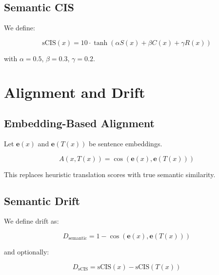 \documentclass{article}
\theoremstyle{definition}
\begin{document}
\subsection{Semantic CIS}
We define:

\begin{equation}
\text{sCIS}(x) = 10 \cdot \tanh\left( \alpha S(x) + \beta C(x) + \gamma R(x) \right)
\end{equation}

with $\alpha=0.5$, $\beta=0.3$, $\gamma=0.2$.

\section{Alignment and Drift}

\subsection{Embedding-Based Alignment}
Let $\mathbf{e}(x)$ and $\mathbf{e}(T(x))$ be sentence embeddings.

\begin{equation}
A(x, T(x)) = \cos(\mathbf{e}(x), \mathbf{e}(T(x)))
\end{equation}

This replaces heuristic translation scores with true semantic similarity.

\subsection{Semantic Drift}
We define drift as:

\begin{equation}
D_{\text{semantic}} = 1 - \cos(\mathbf{e}(x), \mathbf{e}(T(x)))
\end{equation}

and optionally:

\begin{equation}
D_{\text{sCIS}} = \text{sCIS}(x) - \text{sCIS}(T(x))
\end{equation}

\end{document}
